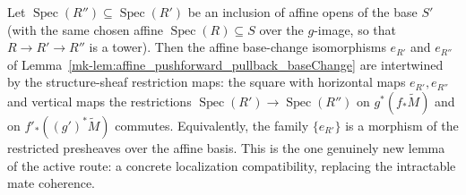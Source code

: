 \begin{lemma}
  \label{mk-lem:pushforwardPullbackBaseChange_restrict_naturality}

  Let \(\operatorname{Spec}(R'') \subseteq \operatorname{Spec}(R')\) be an inclusion of
  affine opens of the base \(S'\) (with the same chosen affine
  \(\operatorname{Spec}(R) \subseteq S\) over the \(g\)-image, so that
  \(R \to R' \to R''\) is a tower). Then the affine base-change isomorphisms
  \(e_{R'}\) and \(e_{R''}\) of
  Lemma~\ref{mk-lem:affine_pushforward_pullback_baseChange} are intertwined by the
  structure-sheaf restriction maps: the square with horizontal maps \(e_{R'}, e_{R''}\)
  and vertical maps the restrictions
  \(\operatorname{Spec}(R') \to \operatorname{Spec}(R'')\) on
  \(g^*(f_*\widetilde{M})\) and on \(f'_*((g')^*\widetilde{M})\) commutes. Equivalently,
  the family \(\{e_{R'}\}\) is a morphism of the restricted presheaves over the affine
  basis. This is the one genuinely new lemma of the active route: a concrete
  localization compatibility, replacing the intractable mate coherence.
\end{lemma}

